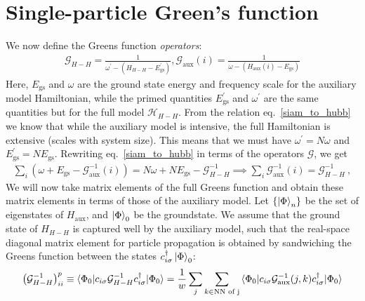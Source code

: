\documentclass{report}
\numberwithin{equation}{section}
\begin{document}
\section{Single-particle Green's function}
We now define the Greens function {\it operators}:
\begin{equation}\begin{aligned}
	\mathcal{G}_{H-H} = \frac{1}{\omega^\prime - \left(H_{H-H} - E_\text{gs}^\prime\right) }, \mathcal{G}_\text{aux}(i) = \frac{1}{\omega - \left(H_\text{aux}(i) - E_\text{gs}\right)}
\end{aligned}\end{equation}
Here, \(E_\text{gs}\) and \(\omega\) are the ground state energy and frequency scale for the auxiliary model Hamiltonian, while the primed quantities \(E_\text{gs}^\prime\) and \(\omega^\prime\) are the same quantities but for the full model \(\mathcal{H}_{H-H}\). From the relation eq.~\ref{siam_to_hubb} we know that while the auxiliary model is intensive, the full Hamiltonian is extensive (scales with system size). This means that we must have \(\omega^\prime = N\omega\) and \(E_\text{gs}^\prime = N E_\text{gs}\).
Rewriting eq.~\ref{siam_to_hubb} in terms of the operators \(\mathcal{G}\), we get
\begin{equation}\begin{aligned}
\sum_i \left(\omega + E_\text{gs} - \mathcal{G}^{-1}_\text{aux}(i)\right) = N\omega + N E_\text{gs} - \mathcal{G}^{-1}_{H-H} \implies \sum_i \mathcal{G}^{-1}_\text{aux}(i) = \mathcal{G}^{-1}_{H-H}~,
\end{aligned}\end{equation}
We will now take matrix elements of the full Greens function and obtain these matrix elements in terms of those of the auxiliary model. Let \(\left\{ \ket{\Phi}_n \right\} \) be the set of eigenstates of \(H_\text{aux}\), and \(\ket{\Phi}_0\) be the groundstate. We assume that the ground state of \(H_{H-H}\) is captured well by the auxiliary model, such that the real-space diagonal matrix element for particle propagation is obtained by sandwiching the Greens function between the states \(c^\dagger_{i\sigma}\ket{\Phi}_0\):
\begin{equation}\begin{aligned}
	\left(\mathcal{G}^{-1}_{H-H}\right)^p_{ii} \equiv \braket{\Phi_0 | c_{i\sigma} \mathcal{G}^{-1}_{H-H} c^\dagger_{i\sigma} | \Phi_0} = \frac{1}{w}\sum_j \sum_{k \in \text{NN of j}}\braket{\Phi_0 | c_{i\sigma} \mathcal{G}^{-1}_\text{aux}(j,k) c^\dagger_{i\sigma} | \Phi_0}
\end{aligned}\end{equation}
\end{document}
